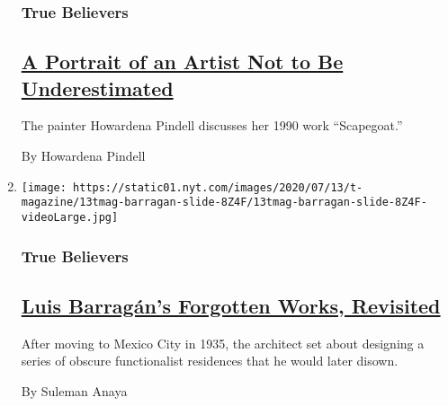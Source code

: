 \begin{enumerate}
  \hypertarget{true-believers-2}{%
  \subsubsection{True Believers}\label{true-believers-2}}

  \hypertarget{a-portrait-of-an-artist-not-to-be-underestimated}{%
  \subsection{\texorpdfstring{\href{/2020/07/24/t-magazine/howardena-pindell.html}{A
  Portrait of an Artist Not to Be
  Underestimated}}{A Portrait of an Artist Not to Be Underestimated}}\label{a-portrait-of-an-artist-not-to-be-underestimated}}

  The painter Howardena Pindell discusses her 1990 work ``Scapegoat.''

  By Howardena Pindell
\item
  \texttt{[image: https://static01.nyt.com/images/2020/07/13/t-magazine/13tmag-barragan-slide-8Z4F/13tmag-barragan-slide-8Z4F-videoLarge.jpg]}

  \hypertarget{true-believers-3}{%
  \subsubsection{True Believers}\label{true-believers-3}}

  \hypertarget{luis-barraguxe1ns-forgotten-works-revisited}{%
  \subsection{\texorpdfstring{\href{/2020/07/24/t-magazine/luis-barragan.html}{Luis
  Barragán's Forgotten Works,
  Revisited}}{Luis Barragán's Forgotten Works, Revisited}}\label{luis-barraguxe1ns-forgotten-works-revisited}}

  After moving to Mexico City in 1935, the architect set about designing
  a series of obscure functionalist residences that he would later
  disown.

  By Suleman Anaya
\end{enumerate}

